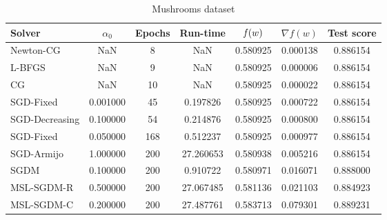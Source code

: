 \begin{table}
\caption{Mushrooms dataset}
\label{tab:mush-tab}
\centering
\begin{tabular}{lS[round-precision=3]S[drop-zero-decimal]S[round-precision=4]S[round-precision=6]S[exponent-mode=scientific]S[round-precision=6]}
\toprule
Solver & {$\alpha_0$} & {Epochs} & {Run-time} & {$\operatorname*{\mathit{f}}(w)$} & {$\nabla f(w)$} & {Test score} \\
\midrule
Newton-CG & NaN & 8 & NaN & 0.580925 & 0.000138 & 0.886154 \\
L-BFGS & NaN & 9 & NaN & 0.580925 & 0.000006 & 0.886154 \\
CG & NaN & 10 & NaN & 0.580925 & 0.000022 & 0.886154 \\
SGD-Fixed & 0.001000 & 45 & 0.197826 & 0.580925 & 0.000722 & 0.886154 \\
SGD-Decreasing & 0.100000 & 54 & 0.214876 & 0.580925 & 0.000800 & 0.886154 \\
SGD-Fixed & 0.050000 & 168 & 0.512237 & 0.580925 & 0.000977 & 0.886154 \\
SGD-Armijo & 1.000000 & 200 & 27.260653 & 0.580938 & 0.005216 & 0.886154 \\
SGDM & 0.100000 & 200 & 0.910722 & 0.580971 & 0.016071 & 0.888000 \\
MSL-SGDM-R & 0.500000 & 200 & 27.067485 & 0.581136 & 0.021103 & 0.884923 \\
MSL-SGDM-C & 0.200000 & 200 & 27.487761 & 0.583713 & 0.079301 & 0.889231 \\
\bottomrule
\end{tabular}
\end{table}



